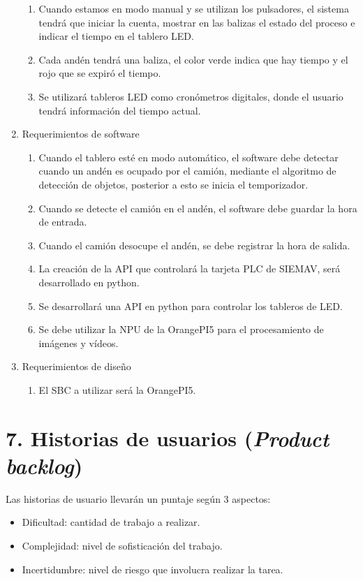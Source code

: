 \documentclass[
11pt, %
]{charter}
\begin{document}
\begin{enumerate}
\begin{enumerate}
			\item Cuando estamos en modo manual y se utilizan los pulsadores, el sistema tendrá que iniciar la cuenta, mostrar en las balizas el estado del proceso e indicar el tiempo en el tablero LED.
			\item Cada andén tendrá una baliza, el color verde indica que hay tiempo y el rojo que se expiró el tiempo.
			\item Se utilizará tableros LED como cronómetros digitales, donde el usuario tendrá información del tiempo actual.
		\end{enumerate}
	\item Requerimientos de software
		\begin{enumerate}
			\item Cuando el tablero esté en modo automático, el software debe detectar cuando un andén es ocupado por el camión, mediante el algoritmo de detección de objetos, posterior a esto se inicia el temporizador.
			\item Cuando se detecte el camión en el andén, el software debe guardar la hora de entrada.
			\item Cuando el camión desocupe el andén, se  debe registrar la hora de salida.
			\item La creación de la API que controlará la tarjeta PLC de SIEMAV, será desarrollado en python.
			\item Se desarrollará una API en python para controlar los tableros de LED.
			\item Se debe utilizar la NPU de la OrangePI5 para el procesamiento de imágenes y vídeos.
		\end{enumerate}
	\item Requerimientos de diseño
		\begin{enumerate}
			\item El SBC a utilizar será la OrangePI5.
		\end{enumerate}
\end{enumerate}

\section{7. Historias de usuarios (\textit{Product backlog})}
\label{sec:backlog}
Las historias de usuario llevarán un puntaje según 3 aspectos:
\begin{itemize}
	\item Dificultad: cantidad de trabajo a realizar.
	\item Complejidad: nivel de sofisticación del trabajo.
	\item Incertidumbre: nivel de riesgo que involucra realizar la tarea.
\end{itemize}
\end{document}
